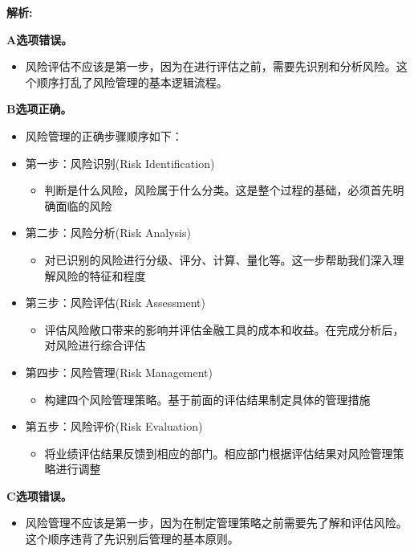 \documentclass{article}
\newenvironment{explanation}
{\textbf{解析:}\par}
{\par}
\begin{document}
    \begin{explanation}
        \textbf{A选项错误。}
        \begin{itemize}
            \item 风险评估不应该是第一步，因为在进行评估之前，需要先识别和分析风险。这个顺序打乱了风险管理的基本逻辑流程。
        \end{itemize}
        
        \textbf{B选项正确。}
        \begin{itemize}
            \item 风险管理的正确步骤顺序如下：
            \item 第一步：风险识别(Risk Identification)
                \begin{itemize}
                    \item 判断是什么风险，风险属于什么分类。这是整个过程的基础，必须首先明确面临的风险
                \end{itemize}
            \item 第二步：风险分析(Risk Analysis)
                \begin{itemize}
                    \item 对已识别的风险进行分级、评分、计算、量化等。这一步帮助我们深入理解风险的特征和程度
                \end{itemize}
            \item 第三步：风险评估(Risk Assessment)
                \begin{itemize}
                    \item 评估风险敞口带来的影响并评估金融工具的成本和收益。在完成分析后，对风险进行综合评估
                \end{itemize}
            \item 第四步：风险管理(Risk Management)
                \begin{itemize}
                    \item 构建四个风险管理策略。基于前面的评估结果制定具体的管理措施
                \end{itemize}
            \item 第五步：风险评价(Risk Evaluation)
                \begin{itemize}
                    \item 将业绩评估结果反馈到相应的部门。相应部门根据评估结果对风险管理策略进行调整
                \end{itemize}
        \end{itemize}
    
        \textbf{C选项错误。}
        \begin{itemize}
            \item 风险管理不应该是第一步，因为在制定管理策略之前需要先了解和评估风险。这个顺序违背了先识别后管理的基本原则。
        \end{itemize}
        

\end{explanation}
\end{document}
